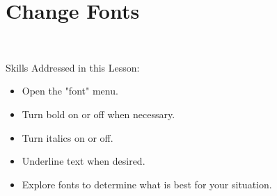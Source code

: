 \documentclass[10pt,letterpaper,twoside]{report}
\begin{document}
{{{%
\clearpage

\section{ Change Fonts}
\

Skills Addressed in this Lesson:
\begin{itemize}
	\item Open the "font" menu.
	\item Turn bold on or off when necessary.
	\item Turn italics on or off.
	\item Underline text when desired.
	\item Explore fonts to determine what is best for your situation.
\end{itemize}



}}}
\end{document}
